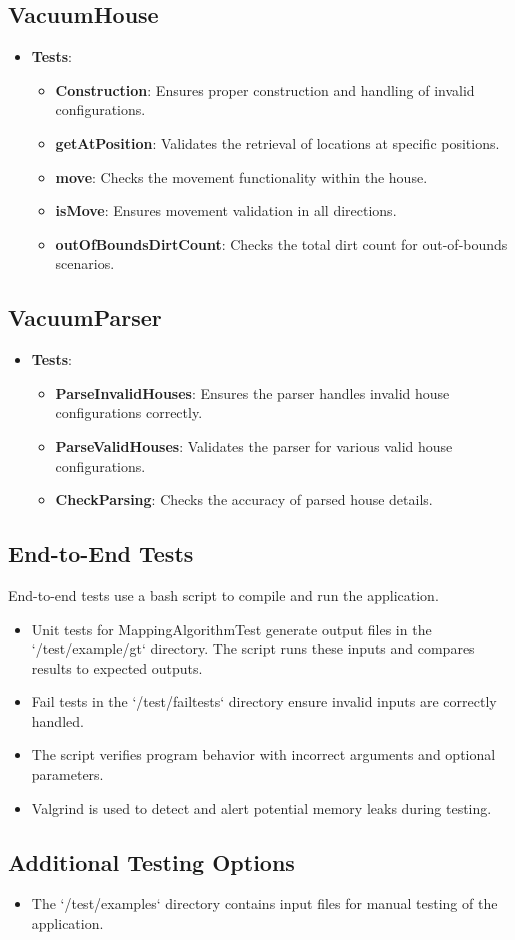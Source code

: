 \documentclass{article}
\begin{document}
\subsection{VacuumHouse}
\begin{itemize}
    \item \textbf{Tests}:
    \begin{itemize}
        \item \textbf{Construction}: Ensures proper construction and handling of invalid configurations.
        \item \textbf{getAtPosition}: Validates the retrieval of locations at specific positions.
        \item \textbf{move}: Checks the movement functionality within the house.
        \item \textbf{isMove}: Ensures movement validation in all directions.
        \item \textbf{outOfBoundsDirtCount}: Checks the total dirt count for out-of-bounds scenarios.
    \end{itemize}
\end{itemize}

\subsection{VacuumParser}
\begin{itemize}
    \item \textbf{Tests}:
    \begin{itemize}
        \item \textbf{ParseInvalidHouses}: Ensures the parser handles invalid house configurations correctly.
        \item \textbf{ParseValidHouses}: Validates the parser for various valid house configurations.
        \item \textbf{CheckParsing}: Checks the accuracy of parsed house details.
    \end{itemize}
\end{itemize}


\subsection{End-to-End Tests}
End-to-end tests use a bash script to compile and run the application.
\begin{itemize}
    \item Unit tests for MappingAlgorithmTest generate output files in the `/test/example/gt` directory. The script runs these inputs and compares results to expected outputs.
    \item Fail tests in the `/test/failtests` directory ensure invalid inputs are correctly handled.
    \item The script verifies program behavior with incorrect arguments and optional parameters.
    \item Valgrind is used to detect and alert potential memory leaks during testing.
\end{itemize}

\subsection{Additional Testing Options}
\begin{itemize}
    \item The `/test/examples` directory contains input files for manual testing of the application.
\end{itemize}
\end{document}
